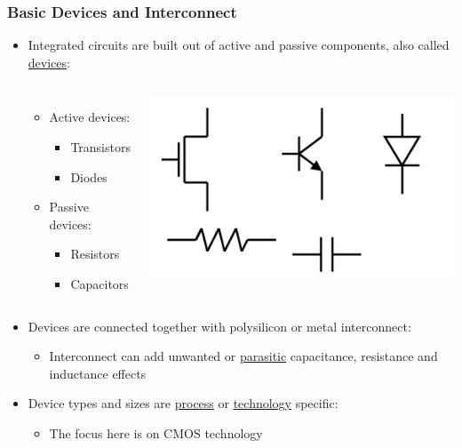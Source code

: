 \documentclass[compress]{beamer}
\begin{document}
\begin{frame}
	\frametitle{Basic Devices and Interconnect}
	\begin{itemize}
		\item Integrated circuits are built out of active and passive
		components, also called \underline{devices}:
		\begin{columns}	
			\begin{itemize}
				\item Active devices:
				\begin{itemize}
					\item Transistors
					\item Diodes
				\end{itemize}
				\item Passive devices:
				\begin{itemize}
					\item Resistors
					\item Capacitors
				\end{itemize}
			\end{itemize}
			\begin{center}
				\includegraphics[width=0.5 \textwidth]{Devices }
			\end{center}
		\end{columns}
		\item Devices are connected together with polysilicon or
		metal interconnect:
		\begin{itemize}
			\item Interconnect can add unwanted or \underline{parasitic} capacitance,
			resistance and inductance effects
		\end{itemize}
	\item Device types and sizes are \underline{process} or \underline{technology}
	specific:
		\begin{itemize}
			\item The focus here is on CMOS technology
		\end{itemize}
	\end{itemize}
\end{frame}
\end{document}
